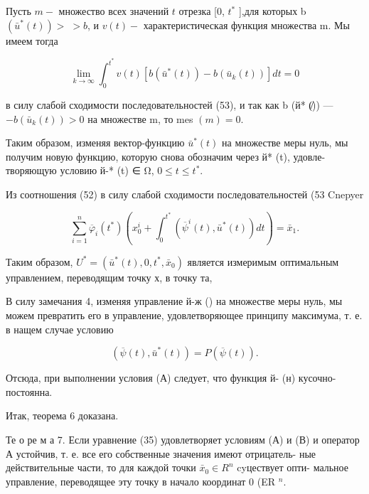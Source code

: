 \documentclass[10pt]{article}
\begin{document}
Пусть \(m -\) множество всех значений \(t\) отрезка [0, \({t}^{ * }\) ],для которых b \(\left( {{\bar{u}}^{ * }\left( t\right) }\right)  > \; > b\), и \(v\left( t\right)  -\) характеристическая функция множества m. Мы имеем тогда

\[
\mathop{\lim }\limits_{{k \rightarrow  \infty }}{\int }_{0}^{{t}^{ * }}v\left( t\right) \left\lbrack  {b\left( {{\bar{u}}^{ * }\left( t\right) }\right)  - b\left( {{\bar{u}}_{k}\left( t\right) }\right) }\right\rbrack  {dt} = 0
\]

в силу слабой сходимости последовательностей (53), и так как b (й* (̸)) — \(- b\left( {{\bar{u}}_{k}\left( t\right) }\right)  > 0\) на множестве m, то mes \(\left( m\right)  = 0\).

Таким образом, изменяя вектор-функцию \({\bar{u}}^{ * }\left( t\right)\) на множестве меры нуль, мы получим новую функцию, которую снова обозначим через й* (t), удовле- творяющую условию й-* (t) ∈ Ω, \(0 \leq  t \leq  {t}^{ * }\).

Из соотношения (52) в силу слабой сходимости последовательностей (53 Cnepyer

\[
\mathop{\sum }\limits_{{i = 1}}^{n}{\overline{\varphi }}_{i}\left( {t}^{ * }\right) \left( {{x}_{0}^{i} + {\int }_{0}^{{t}^{ * }}\left( {{\overline{\psi }}^{i}\left( t\right),{\bar{u}}^{ * }\left( t\right) }\right) {dt}}\right)  = {\bar{x}}_{1}.
\]

Таким образом, \({U}^{ * } = \left( {{\bar{u}}^{ * }\left( t\right),0,{t}^{ * },{\bar{x}}_{0}}\right)\) является измеримым оптимальным управлением, переводящим точку х, в точку та,

В силу замечания 4, изменяя управление й-ж () на множестве меры нуль, мы можем превратить его в управление, удовлетворяющее принципу максимума, т. е. в нащем случае условию

\[
\left( {\overline{\psi }\left( t\right),{\bar{u}}^{ * }\left( t\right) }\right)  = P\left( {\overline{\psi }\left( t\right) }\right).
\]

Отсюда, при выполнении условия (А) следует, что функция й- (н) кусочно- постоянна.

Итак, теорема 6 доказана.

Те о ре м а 7. Если уравнение (35) удовлетворяет условиям (А) и (В) и оператор А устойчив, т. е. все его собственные значения имеют отрицатель- ные действительные части, то для каждой точки \({\bar{x}}_{0} \in  {R}^{n}\) cyцествует опти- мальное управление, переводящее эту точку в начало координат 0 (ER \({}^{n}\).
\end{document}
